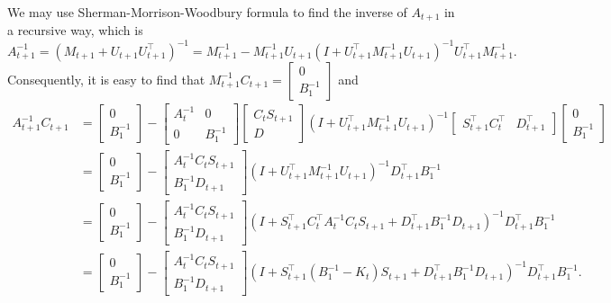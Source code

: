We may use Sherman-Morrison-Woodbury formula to find the inverse of $A_{t+1}$ in a recursive way, which is 
\begin{equation}
A_{t+1}^{-1} = (M_{t+1}+U_{t+1}U_{t+1}^\top)^{-1}= M_{t+1}^{-1}-M_{t+1}^{-1}U_{t+1}(I+U_{t+1}^\top M_{t+1}^{-1}U_{t+1})^{-1}U_{t+1}^\top M_{t+1}^{-1}.
\end{equation}
Consequently, it is easy to find that $M_{t+1}^{-1}C_{t+1} =\begin{bmatrix} 0 \\ B_1^{-1} \end{bmatrix} $ and 
\begin{align*}
A_{t+1}^{-1}C_{t+1} &= \begin{bmatrix} 0 \\ B_1^{-1} \end{bmatrix}  - \begin{bmatrix}
A_t^{-1} & 0 \\ 0 & B_1^{-1} \end{bmatrix} \begin{bmatrix} C_tS_{t+1} \\ D \end{bmatrix}
(I+U_{t+1}^\top M_{t+1}^{-1}U_{t+1})^{-1}  \begin{bmatrix}
S_{t+1}^\top C_t^\top & D_{t+1}^\top \end{bmatrix} \begin{bmatrix} 0 \\ B_1^{-1} \end{bmatrix}  \\ 
& = \begin{bmatrix} 0 \\ B_1^{-1} \end{bmatrix}  - \begin{bmatrix}
A_t^{-1} C_tS_{t+1} \\B_1^{-1}D_{t+1} \end{bmatrix} 
(I+U_{t+1}^\top M_{t+1}^{-1}U_{t+1})^{-1}  D_{t+1}^\top B_1^{-1} \\ 
& = \begin{bmatrix} 0 \\ B_1^{-1} \end{bmatrix}  - \begin{bmatrix}
A_t^{-1} C_tS_{t+1} \\B_1^{-1}D_{t+1} \end{bmatrix} 
(I+ S_{t+1}^\top C_t^\top A_t^{-1} C_t S_{t+1} +D_{t+1}^\top B_1^{-1}D_{t+1}  )^{-1}  D_{t+1}^\top B_1^{-1} \\ 
& = \begin{bmatrix} 0 \\ B_1^{-1} \end{bmatrix}  - \begin{bmatrix}
A_t^{-1} C_tS_{t+1} \\B_1^{-1}D_{t+1} \end{bmatrix} 
(I+ S_{t+1}^\top (B_1^{-1} - K_t)  S_{t+1} +D_{t+1}^\top B_1^{-1}D_{t+1}  )^{-1}  D_{t+1}^\top B_1^{-1}.
\end{align*}
